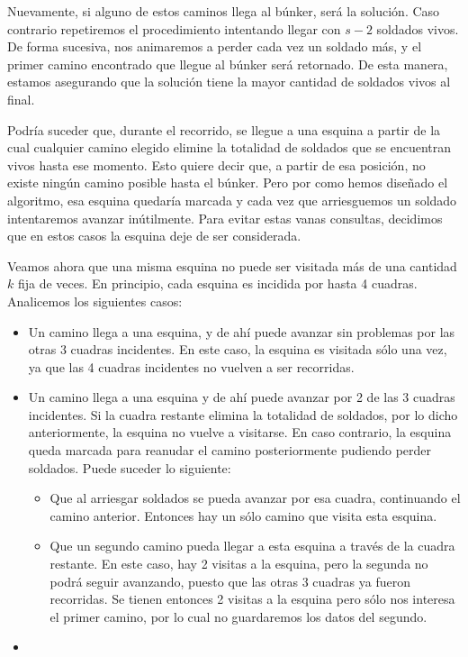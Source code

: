 Nuevamente, si alguno de estos caminos llega al búnker, será la solución.  Caso contrario repetiremos el procedimiento intentando llegar con $s-2$ soldados vivos. De forma sucesiva, nos animaremos a perder cada vez un soldado más, y el primer camino encontrado que llegue al búnker será retornado.  De esta manera, estamos asegurando que la solución tiene la mayor cantidad de soldados vivos al final.

Podría suceder que, durante el recorrido, se llegue a una esquina a partir de la cual cualquier camino elegido elimine la totalidad de soldados que se encuentran vivos hasta ese momento.  Esto quiere decir que, a partir de esa posición, no existe ningún camino posible hasta el búnker. Pero por como hemos diseñado el algoritmo, esa esquina quedaría marcada y cada vez que arriesguemos un soldado intentaremos avanzar inútilmente.  Para evitar estas vanas consultas, decidimos que en estos casos la esquina deje de ser considerada.

Veamos ahora que una misma esquina no puede ser visitada más de una cantidad $k$ fija de veces. En principio, cada esquina es incidida por hasta 4 cuadras.  Analicemos los siguientes casos:

\begin{itemize}
	\item Un camino llega a una esquina, y de ahí puede avanzar sin problemas por las otras 3 cuadras incidentes. En este caso, la esquina es visitada sólo una vez, ya que las 4 cuadras incidentes no vuelven a ser recorridas.
	\item Un camino llega a una esquina y de ahí puede avanzar por 2 de las 3 cuadras incidentes.  Si la cuadra restante elimina la totalidad de soldados, por lo dicho anteriormente, la esquina no vuelve a visitarse.  En caso contrario, la esquina queda marcada para reanudar el camino posteriormente pudiendo perder soldados. Puede suceder lo siguiente:
	\begin{itemize}
		\item Que al arriesgar soldados se pueda avanzar por esa cuadra, continuando el camino anterior. Entonces hay un sólo camino que visita esta esquina.
		\item Que un segundo camino pueda llegar a esta esquina a través de la cuadra restante.  En este caso, hay 2 visitas a la esquina, pero la segunda no podrá seguir avanzando, puesto que las otras 3 cuadras ya fueron recorridas.  Se tienen entonces 2 visitas a la esquina pero sólo nos interesa el primer camino, por lo cual no guardaremos los datos del segundo.
	\end{itemize}
	\item %
\end{itemize}

